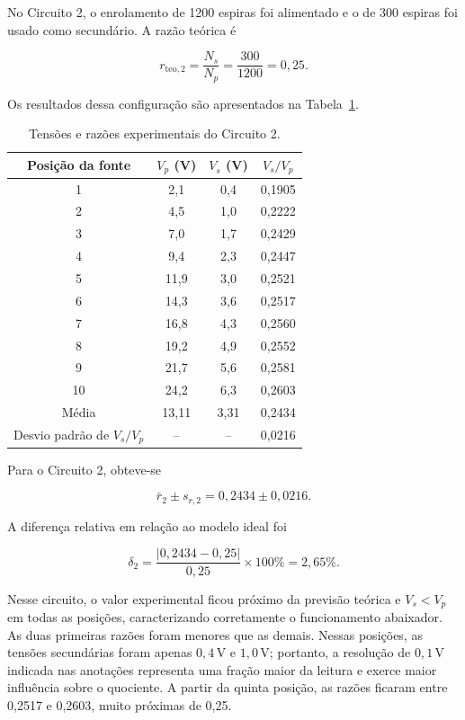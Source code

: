 \documentclass[a4paper,12pt]{article}
\begin{document}
No Circuito 2, o enrolamento de 1200 espiras foi alimentado e o de 300 espiras
foi usado como secundário. A razão teórica é

\begin{equation}
  r_{\mathrm{teo},2}=\frac{N_s}{N_p}
  =\frac{300}{1200}=0{,}25.
  \label{eq:teorica2}
\end{equation}

Os resultados dessa configuração são apresentados na
Tabela~\ref{tab:circuito2}.

\begin{table}[H]
  \centering
  \caption{Tensões e razões experimentais do Circuito 2.}
  \label{tab:circuito2}
  \medskip
  \begin{tabular}{cccc}
    \toprule
    Posição da fonte & $V_p$ (V) & $V_s$ (V) & $V_s/V_p$ \\
    \midrule
     1 &  2,1 & 0,4 & 0,1905 \\
     2 &  4,5 & 1,0 & 0,2222 \\
     3 &  7,0 & 1,7 & 0,2429 \\
     4 &  9,4 & 2,3 & 0,2447 \\
     5 & 11,9 & 3,0 & 0,2521 \\
     6 & 14,3 & 3,6 & 0,2517 \\
     7 & 16,8 & 4,3 & 0,2560 \\
     8 & 19,2 & 4,9 & 0,2552 \\
     9 & 21,7 & 5,6 & 0,2581 \\
    10 & 24,2 & 6,3 & 0,2603 \\
    \midrule
    Média & 13,11 & 3,31 & 0,2434 \\
    Desvio padrão de $V_s/V_p$ & -- & -- & 0,0216 \\
    \bottomrule
  \end{tabular}
\end{table}

Para o Circuito 2, obteve-se

\begin{equation}
  \boxed{\bar r_2\pm s_{r,2}=0{,}2434\pm0{,}0216}.
\end{equation}

A diferença relativa em relação ao modelo ideal foi

\begin{equation}
  \delta_2=\frac{|0{,}2434-0{,}25|}{0{,}25}\times100\%=2{,}65\%.
\end{equation}

Nesse circuito, o valor experimental ficou próximo da previsão teórica e
$V_s<V_p$ em todas as posições, caracterizando corretamente o funcionamento
abaixador. As duas primeiras razões foram menores que as demais. Nessas posições,
as tensões secundárias foram apenas $0{,}4\,\mathrm{V}$ e $1{,}0\,\mathrm{V}$;
portanto, a resolução de $0{,}1\,\mathrm{V}$ indicada nas anotações representa
uma fração maior da leitura e exerce maior influência sobre o quociente. A partir
da quinta posição, as razões ficaram entre 0,2517 e 0,2603, muito próximas de
0,25.
\end{document}
